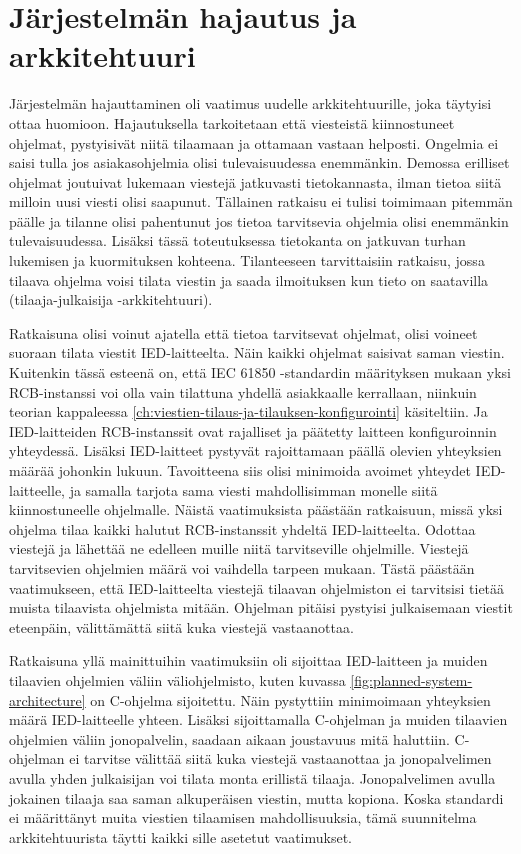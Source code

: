 \section{Järjestelmän hajautus ja arkkitehtuuri}
\label{ch:järjestelmän-hajautus-ja-arkkitehtuuri}
Järjestelmän hajauttaminen oli vaatimus uudelle arkkitehtuurille, joka täytyisi ottaa huomioon. Hajautuksella tarkoitetaan että viesteistä kiinnostuneet ohjelmat, pystyisivät niitä tilaamaan ja ottamaan vastaan helposti. Ongelmia ei saisi tulla jos asiakasohjelmia olisi tulevaisuudessa enemmänkin. Demossa erilliset ohjelmat joutuivat lukemaan viestejä jatkuvasti tietokannasta, ilman tietoa siitä milloin uusi viesti olisi saapunut. Tällainen ratkaisu ei tulisi toimimaan pitemmän päälle ja tilanne olisi pahentunut jos tietoa tarvitsevia ohjelmia olisi enemmänkin tulevaisuudessa. Lisäksi tässä toteutuksessa tietokanta on jatkuvan turhan lukemisen ja kuormituksen kohteena. Tilanteeseen tarvittaisiin ratkaisu, jossa tilaava ohjelma voisi tilata viestin ja saada ilmoituksen kun tieto on saatavilla (tilaaja-julkaisija -arkkitehtuuri).

Ratkaisuna olisi voinut ajatella että tietoa tarvitsevat ohjelmat, olisi voineet suoraan tilata viestit IED-laitteelta. Näin kaikki ohjelmat saisivat saman viestin. Kuitenkin tässä esteenä on, että IEC 61850 -standardin määrityksen mukaan yksi RCB-instanssi voi olla vain tilattuna yhdellä asiakkaalle kerrallaan, niinkuin teorian kappaleessa \ref{ch:viestien-tilaus-ja-tilauksen-konfigurointi} käsiteltiin. Ja IED-laitteiden RCB-instanssit ovat rajalliset ja päätetty laitteen konfiguroinnin yhteydessä. Lisäksi IED-laitteet pystyvät rajoittamaan päällä olevien yhteyksien määrää johonkin lukuun. Tavoitteena siis olisi minimoida avoimet yhteydet IED-laitteelle, ja samalla tarjota sama viesti mahdollisimman monelle siitä kiinnostuneelle ohjelmalle. Näistä vaatimuksista päästään ratkaisuun, missä yksi ohjelma tilaa kaikki halutut RCB-instanssit yhdeltä IED-laitteelta. Odottaa viestejä ja lähettää ne edelleen muille niitä tarvitseville ohjelmille. Viestejä tarvitsevien ohjelmien määrä voi vaihdella tarpeen mukaan. Tästä päästään vaatimukseen, että IED-laitteelta viestejä tilaavan ohjelmiston ei tarvitsisi tietää muista tilaavista ohjelmista mitään. Ohjelman pitäisi pystyisi julkaisemaan viestit eteenpäin, välittämättä siitä kuka viestejä vastaanottaa.

Ratkaisuna yllä mainittuihin vaatimuksiin oli sijoittaa IED-laitteen ja muiden tilaavien ohjelmien väliin väliohjelmisto, kuten kuvassa \ref{fig:planned-system-architecture} on C-ohjelma sijoitettu. Näin pystyttiin minimoimaan yhteyksien määrä IED-laitteelle yhteen. Lisäksi sijoittamalla C-ohjelman ja muiden tilaavien ohjelmien väliin jonopalvelin, saadaan aikaan joustavuus mitä haluttiin. C-ohjelman ei tarvitse välittää siitä kuka viestejä vastaanottaa ja jonopalvelimen avulla yhden julkaisijan voi tilata monta erillistä tilaaja. Jonopalvelimen avulla jokainen tilaaja saa saman alkuperäisen viestin, mutta kopiona. Koska standardi ei määrittänyt muita viestien tilaamisen mahdollisuuksia, tämä suunnitelma arkkitehtuurista täytti kaikki sille asetetut vaatimukset.

